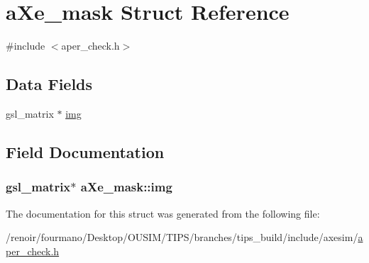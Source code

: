 \hypertarget{structaXe__mask}{
\section{aXe\_\-mask Struct Reference}
\label{structaXe__mask}
}


{\ttfamily \#include $<$aper\_\-check.h$>$}\subsection*{Data Fields}
\begin{DoxyCompactItemize}
\item 
gsl\_\-matrix $\ast$ \hyperlink{structaXe__mask_a7f66e5f5245bfff4c028fca8d53f8ef4}{img}
\end{DoxyCompactItemize}


\subsection{Field Documentation}
\hypertarget{structaXe__mask_a7f66e5f5245bfff4c028fca8d53f8ef4}{
\subsubsection[{img}]{\setlength{\rightskip}{0pt plus 5cm}gsl\_\-matrix$\ast$ {\bf aXe\_\-mask::img}}}
\label{structaXe__mask_a7f66e5f5245bfff4c028fca8d53f8ef4}


The documentation for this struct was generated from the following file:\begin{DoxyCompactItemize}
\item 
/renoir/fourmano/Desktop/OUSIM/TIPS/branches/tips\_\-build/include/axesim/\hyperlink{aper__check_8h}{aper\_\-check.h}\end{DoxyCompactItemize}
